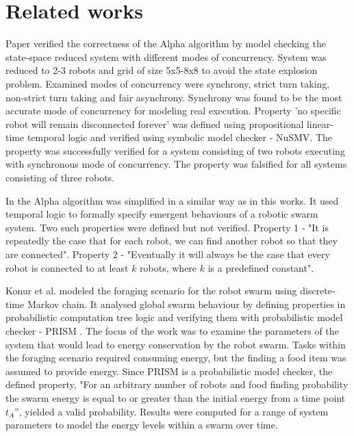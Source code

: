 \section{Related works}

Paper  \cite{Towards_Temporal_Verification_of_Emergent_Behaviours_in_Swarm_Robotic_Systems} verified the correctness of the Alpha algorithm by model checking the state-space reduced system with different modes of concurrency. System was reduced to 2-3 robots and grid of size 5x5-8x8 to avoid the state explosion problem. Examined modes of concurrency were synchrony, strict turn taking, non-strict turn taking and fair asynchrony. Synchrony was found to be the most accurate mode of concurrency for modeling real execution. Property 'no specific robot will remain disconnected forever' was defined using propositional linear-time temporal logic and verified using symbolic model checker - NuSMV. The property was successfully verified for a system consisting of two robots executing with synchronous mode of concurrency. The property was falsified for all systems consisting of three robots.

In \cite{On_Formal_Specification_of_Emergent_Behaviours_in_Swarm_Robotic_Systems} the Alpha algorithm was simplified in a similar way as in this works. It used temporal logic to formally specify emergent behaviours of a robotic swarm system. Two such properties were defined but not verified. Property 1 - "It is repeatedly the case that for each robot, we can find another robot so that they are connected". Property 2 - "Eventually it will always be the case that every robot is connected to at least $k$ robots, where $k$ is a predefined constant".

Konur et al. \cite{Formal_Verification_of_Probabilistic_Swarm_Behaviours} modeled the foraging scenario for the robot swarm using discrete-time Markov chain. It analysed global swarm behaviour by defining properties in probabilistic computation tree logic and verifying them with probabilistic model checker - PRISM \cite{PRISM_4.0:_Verification_of_Probabilistic_Real-time_Systems}. The focus of the work was to examine the parameters of the system that would lead to energy conservation by the robot swarm. Tasks within the foraging scenario required consuming energy, but the finding a food item was assumed to provide energy. Since PRISM is a probabilistic model checker, the defined property, "For an arbitrary number of robots and food finding probability the swarm energy is equal to or greater than the initial energy from a time point $t_A$”, yielded a valid probability. Results were computed for a range of system parameters to model the energy levels within a swarm over time.  
